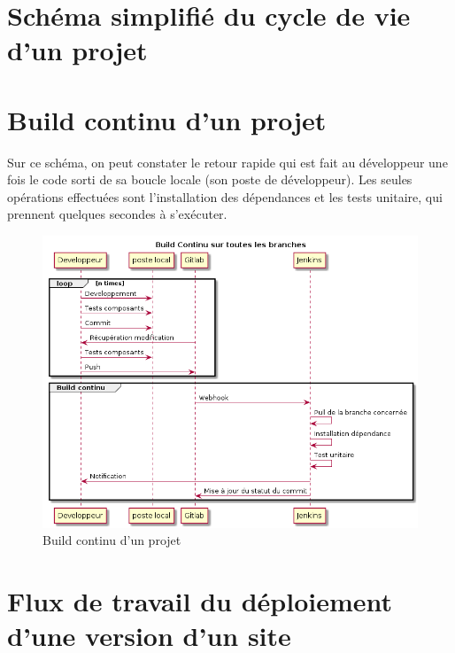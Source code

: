 \section{Schéma simplifié du cycle de vie d'un projet}

\clearpage
\section{Build continu d'un projet \naq}

Sur ce schéma, on peut constater le retour rapide qui est fait au développeur une fois le code sorti de sa boucle locale (son poste de développeur). Les seules opérations effectuées sont l'installation des dépendances et les tests unitaire, qui prennent quelques secondes à s'exécuter.

\begin{figure}[ht]
	\centering
	\includegraphics[scale=0.6,angle=-90]{img/build-continu.png}
	\caption{Build continu d'un projet \naq}
	\label{annexe:build-continu}
\end{figure}

\clearpage
\section{Flux de travail du déploiement d'une version d'un site \naq}

